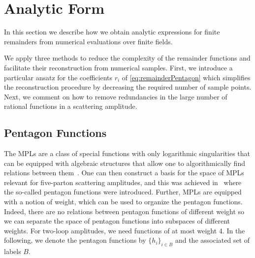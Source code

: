 \section{Analytic Form}
\label{sec:AnalyticForm}
In this section we describe how we obtain analytic expressions
for finite remainders from numerical evaluations over finite fields.

We apply three methods to reduce the complexity of the remainder
functions and facilitate their reconstruction from numerical samples.
%
First, we introduce a particular ansatz for the coefficients $r_i$ of
\cref{eq:remainderPentagon} which simplifies the reconstruction procedure by
decreasing the required number of sample points. 
%
Next, we comment on how to remove redundancies
in the large number of rational functions in a scattering amplitude. 


\subsection{Pentagon Functions}
\label{sec:pentagon}
The MPLs are a class of special functions with 
only logarithmic singularities that can be equipped with algebraic
structures that allow one to algorithmically find relations between
them~\cite{Goncharov:2010jf,Duhr:2011zq,Duhr:2012fh}. One can then
construct a basis for the space of MPLs relevant for five-parton
scattering amplitudes, and this was achieved in~\cite{Gehrmann:2018yef}
where the so-called pentagon functions were introduced.
Further, MPLs are equipped with a notion of weight, which can
be used to organize the pentagon functions. Indeed, there are
no relations between pentagon functions of different weight so we can
separate the space of pentagon functions into subspaces of different 
weights. For two-loop amplitudes, we need functions of at most weight 4.
In the following, we denote the pentagon functions by $\{h_i\}_{i\in B}$ 
and the associated set of labels $B$. 

